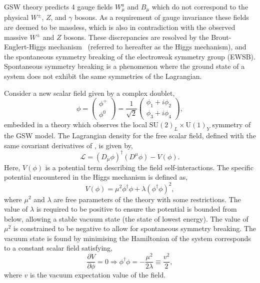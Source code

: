GSW theory predicts 4 gauge fields $W^a_\mu$ and $B_\mu$ which do not correspond to the physical $W^\pm$, $Z$, and $\gamma$ bosons.
As a requirement of gauge invariance these fields are deemed to be massless, which is also in contradiction with the observed massive $W^\pm$ and $Z$ bosons.
These discrepancies are resolved by the Brout-Englert-Higgs mechanism~\cite{higgs1964, englert1964, brout1964} (referred to hereafter as the Higgs mechanism), and the spontaneous symmetry breaking of the electroweak symmetry group (EWSB).
Spontaneous symmetry breaking is a phenomenon where the ground state of a system does not exhibit the same symmetries of the Lagrangian.

Consider a new scalar field given by a complex doublet,
\begin{equation}
	\phi = \begin{pmatrix} \phi^+ \\ \phi^0 \end{pmatrix} = \frac{1}{\sqrt{2}} \begin{pmatrix} \phi_1 + i \phi_2 \\ \phi_3 + i \phi_4 \end{pmatrix},
\end{equation}
embedded in a theory which observes the local $\text{SU}(2)_L \times \text{U}(1)_Y$ symmetry of the GSW model.
The Lagrangian density for the free scalar field, defined with the same covariant derivatives of , is given by,
\begin{equation}
	\label{eq:higgs_lagrangian}
	\mathcal{L} = (D_\mu \phi)^\dagger (D^\mu \phi) - V(\phi).
\end{equation}
Here, $V(\phi)$ is a potential term describing the field self-interactions.
The specific potential encountered in the Higgs mechanism is defined as,
\begin{equation}
	\label{eq:higgs_potential}
	V(\phi) = \mu^2 \phi^\dagger \phi + \lambda (\phi^\dagger \phi)^2,
\end{equation}
where $\mu^2$ and $\lambda$ are free parameters of the theory with some restrictions.
The value of $\lambda$ is required to be positive to ensure the potential is bounded from below, allowing a stable vacuum state (the state of lowest energy).
The value of $\mu^2$ is constrained to be negative to allow for spontaneous symmetry breaking.
The vacuum state is found by minimising the Hamiltonian of the system corresponds to a constant scalar field satisfying,
\begin{equation}
	\frac{\partial V}{\partial \phi} = 0 \Longrightarrow  \phi^\dagger \phi = -\frac{\mu^2}{2\lambda} \equiv \frac{v^2}{2},
\end{equation}
where $v$ is the vacuum expectation value of the field.

